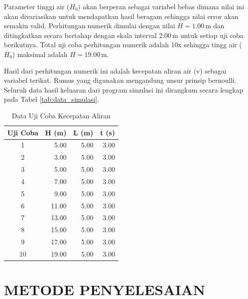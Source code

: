 \documentclass[conference]{IEEEtran}
\begin{document}
Parameter tinggi air ($H_0$) akan berperan sebagai variabel bebas dimana nilai ini akan divariasikan untuk mendapatkan hasil beragam sehingga nilai error akan semakin valid. Perhitungan numerik dimulai dengan nilai $H = 1.00 \, \text{m}$ dan ditingkatkan secara bertahap dengan skala interval $2.00 \, \text{m}$ untuk setiap uji coba berikutnya. Total uji coba perhitungan numerik adalah 10x sehingga tingg air ($H_0$) maksimal adalah $H = 19.00 \, \text{m}$. 

Hasil dari perhitungan numerik ini adalah kecepatan aliran air (v) sebagai variabel terikat. Rumus yang digunakan mengandung unsur prinsip bernoulli. Seluruh data hasil keluaran dari program simulasi ini dirangkum secara lengkap pada Tabel \ref{tab:data_simulasi}.

\begin{table}[htbp]
\centering
\caption{Data Uji Coba Kecepatan Aliran}
\label{tab:data_uji_rapi}
\renewcommand{\arraystretch}{1.2}
\begin{tabular}{|c|r|r|r|}
\hline
\textbf{Uji Coba} & \multicolumn{1}{c|}{\textbf{H (m)}} & \multicolumn{1}{c|}{\textbf{L (m)}} & \multicolumn{1}{c|}{\textbf{t (s)}} \\
\hline
1  & 5.00 & 5.00 & 3.00  \\
2  & 3.00 & 5.00 & 3.00  \\
3  & 5.00 & 5.00 & 3.00  \\
4  & 7.00 & 5.00 & 3.00  \\
5  & 9.00 & 5.00 & 3.00  \\
6  & 11.00 & 5.00 & 3.00 \\
7  & 13.00 & 5.00 & 3.00 \\
8  & 15.00 & 5.00 & 3.00 \\
9  & 17.00 & 5.00 & 3.00 \\
10 & 19.00 & 5.00 & 3.00 \\
\hline
\end{tabular}
\end{table}

\section{METODE PENYELESAIAN}
\end{document}
